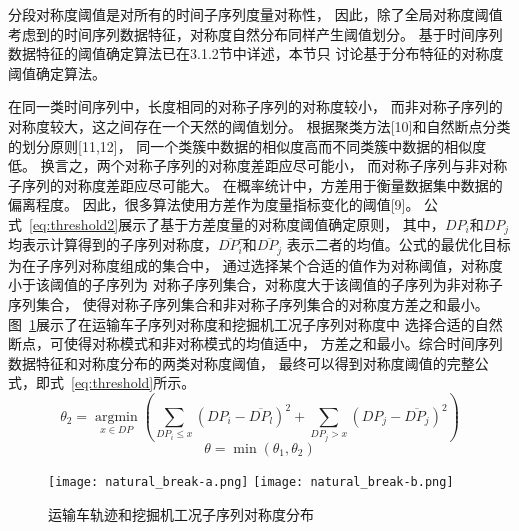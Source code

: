 分段对称度阈值是对所有的时间子序列度量对称性，
因此，除了全局对称度阈值
考虑到的时间序列数据特征，对称度自然分布同样产生阈值划分。
基于时间序列数据特征的阈值确定算法已在3.1.2节中详述，本节只
讨论基于分布特征的对称度阈值确定算法。

在同一类时间序列中，长度相同的对称子序列的对称度较小，
而非对称子序列的对称度较大，这之间存在一个天然的阈值划分。
根据聚类方法[10]和自然断点分类的划分原则[11,12]，
同一个类簇中数据的相似度高而不同类簇中数据的相似度低。
换言之，两个对称子序列的对称度差距应尽可能小，
而对称子序列与非对称子序列的对称度差距应尽可能大。
在概率统计中，方差用于衡量数据集中数据的偏离程度。
因此，很多算法使用方差作为度量指标变化的阈值[9]。
公式~\ref{eq:threshold2}展示了基于方差度量的对称度阈值确定原则，
其中，$DP_i$和$DP_j$均表示计算得到的子序列对称度，$\overline{DP_{i}}$̅和$\overline{DP_{j}}$
表示二者的均值。公式的最优化目标为在子序列对称度组成的集合中，
通过选择某个合适的值作为对称阈值，对称度小于该阈值的子序列为
对称子序列集合，对称度大于该阈值的子序列为非对称子序列集合，
使得对称子序列集合和非对称子序列集合的对称度方差之和最小。
图~\ref{fig:natural_break}展示了在运输车子序列对称度和挖掘机工况子序列对称度中
选择合适的自然断点，可使得对称模式和非对称模式的均值适中，
方差之和最小。综合时间序列数据特征和对称度分布的两类对称度阈值，
最终可以得到对称度阈值的完整公式，即式~\ref{eq:threshold}所示。
\begin{equation}
  \theta_{2}=\underset{x \in D P}{\operatorname{argmin}}\left(\sum_{D P_{i} \leq x}\left(D P_{i}-\overline{D P_{l}}\right)^{2}+\sum_{D P_{j}>x}\left(D P_{j}-\overline{D P_{j}}\right)^{2}\right)
  \label{eq:threshold2}
\end{equation}
\begin{equation}
  \theta=\min \left(\theta_{1}, \theta_{2}\right)
  \label{eq:threshold}
\end{equation}
\begin{figure}
  \centering
  {\texttt{[image: natural\_break-a.png]}}
  {\texttt{[image: natural\_break-b.png]}}
  \caption{运输车轨迹和挖掘机工况子序列对称度分布}
  \label{fig:natural_break}
\end{figure}

\renewcommand{\algorithmicrequire}{\textbf{输入：}\unskip}
\renewcommand{\algorithmicensure}{\textbf{输出：}\unskip}


